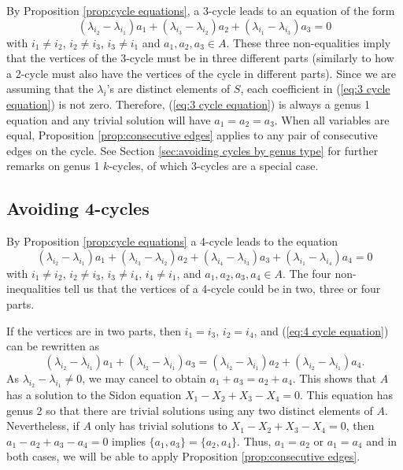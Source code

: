 \documentclass[12pt]{article}%
\begin{document}
By Proposition \ref{prop:cycle equations}, a 3-cycle leads to an equation of the form 
\begin{equation}\label{eq:3 cycle equation}
( \lambda_{i_2} - \lambda_{i_1} ) a_1 + 
( \lambda_{i_3} - \lambda_{i_2} ) a_2 + 
( \lambda_{i_1} - \lambda_{i_3} ) a_3 =0
\end{equation}
with $i_1 \neq i_2$, $i_2 \neq i_3$, $i_3 \neq i_1$ and 
$a_1,a_2,a_3 \in A$.  These three non-equalities
imply that the vertices of the 3-cycle must be in three different parts (similarly to how a 2-cycle must also have the vertices of the cycle in different parts).  
Since we are assuming that the $\lambda_i$'s are distinct
elements of $S$, each coefficient in (\ref{eq:3 cycle equation}) is not zero.  Therefore, 
(\ref{eq:3 cycle equation}) is always a genus 1 equation and any trivial solution will have $a_1 = a_2 = a_3$. When all variables are equal, Proposition \ref{prop:consecutive edges} applies to any pair of consecutive edges on the cycle.  See Section \ref{sec:avoiding cycles by genus type} for further remarks on genus 1 $k$-cycles, of which 3-cycles are a special case.    


\subsection{Avoiding 4-cycles}

By Proposition \ref{prop:cycle equations} a 4-cycle leads to the equation 
\begin{equation}\label{eq:4 cycle equation}
( \lambda_{i_2} - \lambda_{i_1} ) a_1 + 
( \lambda_{i_3} - \lambda_{i_2} ) a_2 + 
( \lambda_{i_4} - \lambda_{i_3} ) a_3 +
( \lambda_{i_1} - \lambda_{i_4} ) a_4 
=0
\end{equation}
with $i_1 \neq i_2$, $i_2 \neq i_3$, $i_3 \neq i_4$, 
$i_4 \neq i_1$, and $a_1,a_2,a_3 ,a_4 \in A$.  The 
four non-inequalities tell us that the vertices of a 4-cycle could be in two, three or four parts.  

If the vertices are in two parts, then $i_1 = i_3$, $i_2 = i_4$, and (\ref{eq:4 cycle equation}) can be rewritten as 
\begin{equation}\label{eq:4 cycle Sidon eq}
( \lambda_{i_2} - \lambda_{i_1} ) a_1 + 
( \lambda_{i_2} - \lambda_{i_1} ) a_3 = 
( \lambda_{i_2} - \lambda_{i_1} ) a_2 +
( \lambda_{i_2} - \lambda_{i_1} ) a_4. 
\end{equation}
As $\lambda_{i_2} - \lambda_{i_1} \neq 0$, we may cancel to obtain $a_1 + a_3  = a_2 + a_4$.  
This shows that $A$ has a solution to the Sidon equation
$X_1  - X_2  + X_3 - X_4 = 0$.  This equation has genus 2 so that there are trivial solutions using any two distinct elements of $A$.  
Nevertheless, if $A$ only has trivial solutions to
$X_1 - X_2 + X_3 - X_4 = 0$, then $a_1 - a_2 + a_3 - a_4 = 0$ implies $\{a_1 , a_3 \} = \{ a_2 , a_4 \}$.  Thus,  $a_1 = a_2$ or $a_1 = a_4$ and in both cases, we will be able to apply Proposition \ref{prop:consecutive edges}.  
\end{document}
